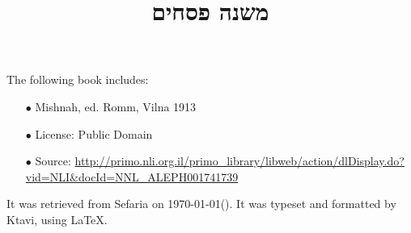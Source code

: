 \documentclass[12pt, openany]{book}
\newcommand{\texttitle}{משנה פסחים}\usepackage{titlesec}
\begin{document}
\frontmatter
{}

\title{\texttitle}

\author{}

\date{}

\maketitle

\begin{minipage}[b][\textheight][b]{\textwidth}\englishfont	
	\begin{english}
		\vfill
		The following book includes:
\begin{itemize}
\item[$\bullet$] Mishnah, ed. Romm, Vilna 1913
\item[$\bullet$] License: Public Domain
\item[$\bullet$] Source: \url{http://primo.nli.org.il/primo_library/libweb/action/dlDisplay.do?vid=NLI&docId=NNL_ALEPH001741739}
\end{itemize}
		It was retrieved from Sefaria on \today\space \texthebrew{(\Hebrewtoday)}.  It was typeset and formatted by Ktavi, using \LaTeX .
		\clearpage
		
	\end{english}
\end{minipage}


\tableofcontents

\clearpage
\mainmatter
{}
\end{document}
